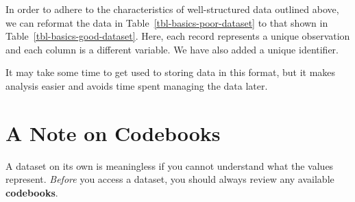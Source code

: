 \documentclass[
  letterpaper,
  DIV=11,
  numbers=noendperiod]{scrreprt}
\theoremstyle{plain}
\theoremstyle{definition}
\theoremstyle{definition}
\theoremstyle{remark}
\begin{document}
In order to adhere to the characteristics of well-structured data
outlined above, we can reformat the data in
Table~\ref{tbl-basics-poor-dataset} to that shown in
Table~\ref{tbl-basics-good-dataset}. Here, each record represents a
unique observation and each column is a different variable. We have also
added a unique identifier.

\begin{table}

\caption{\label{tbl-basics-good-dataset}Example of a well-structured
dataset. The data is from a hypothetical study comparing battery
lifetimes (hours).}


\end{table}%

It may take some time to get used to storing data in this format, but it
makes analysis easier and avoids time spent managing the data later.

\section{A Note on Codebooks}\label{a-note-on-codebooks}

A dataset on its own is meaningless if you cannot understand what the
values represent. \emph{Before} you access a dataset, you should always
review any available \textbf{codebooks}.
\end{document}
